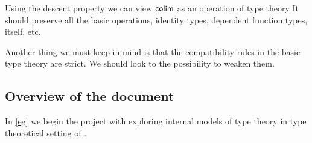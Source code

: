 Using the descent property we can view $\mathsf{colim}$ as an operation of type theory
It should preserve all the basic operations, identity types, dependent function
types, itself, etc.

Another thing we must keep in mind is that the compatibility rules in the basic
type theory are strict. We should look to the possibility to weaken them.

\subsection{Overview of the document}
In \autoref{eg} we begin the project with exploring internal models of type theory
in type theoretical setting of \cite{TheBook}.

